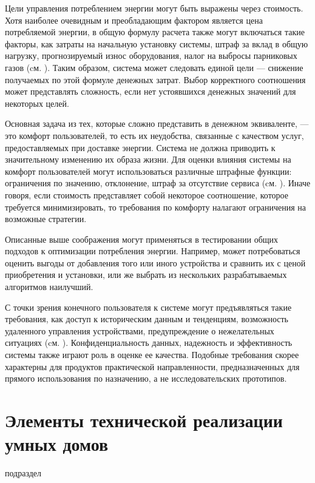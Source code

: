 Цели управления потреблением энергии могут быть выражены через стоимость. Хотя наиболее очевидным и преобладающим фактором является цена потребляемой энергии, в общую формулу расчета также могут включаться такие факторы, как затраты на начальную установку системы, штраф за вклад в общую нагрузку, прогнозируемый износ оборудования, налог на выбросы парниковых газов (cм. ). Таким образом, система может следовать единой цели — снижение получаемых по этой формуле денежных затрат. Выбор корректного соотношения может представлять сложность, если нет устоявшихся денежных значений для некоторых целей.

Основная задача из тех, которые сложно представить в денежном эквиваленте, — это комфорт пользователей, то есть их неудобства, связанные с качеством услуг, предоставляемых при доставке энергии. Система не должна приводить к значительному изменению их образа жизни. Для оценки влияния системы на комфорт пользователей могут использоваться различные штрафные функции: ограничения по значению, отклонение, штраф за отсутствие сервиса (cм. ). Иначе говоря, если стоимость представляет собой некоторое соотношение, которое требуется минимизировать, то требования по комфорту налагают ограничения на возможные стратегии.

Описанные выше соображения могут применяться в тестировании общих подходов к оптимизации потребления энергии. Например, может потребоваться оценить выгоды от добавления того или иного устройства и сравнить их с ценой приобретения и установки, или же выбрать из нескольких разрабатываемых алгоритмов наилучший.

С точки зрения конечного пользователя к системе могут предъявляться такие требования, как доступ к историческим данным и тенденциям, возможность удаленного управления устройствами, предупреждение о нежелательных ситуациях  (cм. ). Конфиденциальность данных, надежность и эффективность системы также играют роль в оценке ее качества. Подобные требования скорее характерны для продуктов практической направленности, предназначенных для прямого использования по назначению, а не исследовательских прототипов.

\section{Элементы технической реализации умных домов}
\label{sec_SH_tec_impl}

\begin{SCn}
	\begin{scnrelfromlist}{подраздел}
	\end{scnrelfromlist}
\end{SCn}


